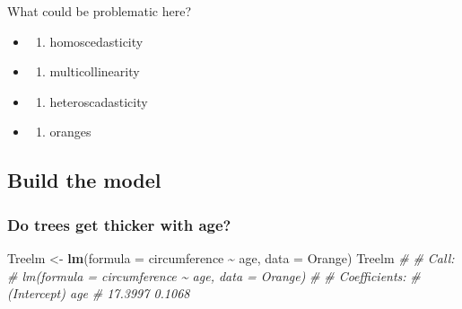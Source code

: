 \documentclass[
]{book}
\newenvironment{Shaded}{\begin{snugshade}}{\end{snugshade}}
\newcommand{\AttributeTok}[1]{\textcolor[rgb]{0.13,0.29,0.53}{#1}}
\newcommand{\CommentTok}[1]{\textcolor[rgb]{0.56,0.35,0.01}{\textit{#1}}}
\newcommand{\FunctionTok}[1]{\textcolor[rgb]{0.13,0.29,0.53}{\textbf{#1}}}
\newcommand{\NormalTok}[1]{#1}
\newcommand{\OtherTok}[1]{\textcolor[rgb]{0.56,0.35,0.01}{#1}}
\newcommand{\SpecialCharTok}[1]{\textcolor[rgb]{0.81,0.36,0.00}{\textbf{#1}}}
\providecommand{\tightlist}{%
  \setlength{\itemsep}{0pt}\setlength{\parskip}{0pt}}
\begin{document}
What could be problematic here?

\begin{itemize}
\tightlist
\item
  \begin{enumerate}
  \def\labelenumi{(\Alph{enumi})}
  \tightlist
  \item
    homoscedasticity\\
  \end{enumerate}
\item
  \begin{enumerate}
  \def\labelenumi{(\Alph{enumi})}
  \setcounter{enumi}{1}
  \tightlist
  \item
    multicollinearity\\
  \end{enumerate}
\item
  \begin{enumerate}
  \def\labelenumi{(\Alph{enumi})}
  \setcounter{enumi}{2}
  \tightlist
  \item
    heteroscadasticity\\
  \end{enumerate}
\item
  \begin{enumerate}
  \def\labelenumi{(\Alph{enumi})}
  \setcounter{enumi}{3}
  \tightlist
  \item
    oranges
  \end{enumerate}
\end{itemize}

\subsection{Build the model}\label{build-the-model-1}

\subsubsection{Do trees get thicker with age?}\label{do-trees-get-thicker-with-age}

\begin{Shaded}
\begin{Highlighting}[]
\NormalTok{Treelm }\OtherTok{\textless{}{-}} \FunctionTok{lm}\NormalTok{(}\AttributeTok{formula =}\NormalTok{ circumference }\SpecialCharTok{\textasciitilde{}}\NormalTok{ age, }\AttributeTok{data =}\NormalTok{ Orange)}
\NormalTok{Treelm}
\CommentTok{\# }
\CommentTok{\# Call:}
\CommentTok{\# lm(formula = circumference \textasciitilde{} age, data = Orange)}
\CommentTok{\# }
\CommentTok{\# Coefficients:}
\CommentTok{\# (Intercept)          age  }
\CommentTok{\#     17.3997       0.1068}
\end{Highlighting}
\end{Shaded}
\end{document}
